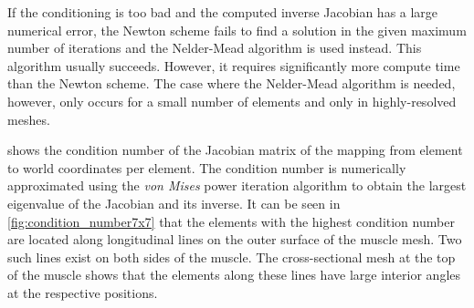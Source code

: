 If the conditioning is too bad and the computed inverse Jacobian has a large numerical error, the Newton scheme fails to find a solution in the given maximum number of iterations and the Nelder-Mead algorithm is used instead. This algorithm usually succeeds. However, it requires significantly more compute time than the Newton scheme. The case where the Nelder-Mead algorithm is needed, however, only occurs for a small number of elements and only in highly-resolved meshes.

 shows the condition number of the Jacobian matrix of the mapping from element to world coordinates per element. The condition number is numerically approximated using the \emph{von Mises} power iteration algorithm to obtain the largest eigenvalue of the Jacobian and its inverse.
It can be seen in \cref{fig:condition_number7x7} that the elements with the highest condition number are located along longitudinal lines on the outer surface of the muscle mesh. Two such lines exist on both sides of the muscle. The cross-sectional mesh at the top of the muscle shows that the elements along these lines have large interior angles at the respective positions. 

